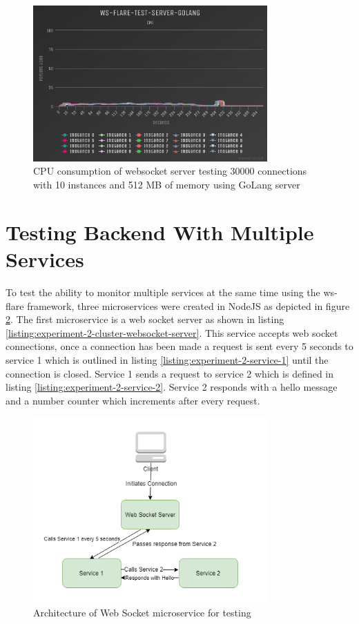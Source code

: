\begin{figure}[H]
  \centering
    \includegraphics[width=0.8\textwidth]{figures/experiments/experiment-1/golang/cpu-30000-512-10.png}
    \caption{CPU consumption of websocket server testing 30000 connections with 10 instances and 512 MB of memory using GoLang server}
    \label{fig:experiment-1-golang-cpu-30000-512-10}
\end{figure}

\section{Testing Backend With Multiple Services}

To test the ability to monitor multiple services at the same time using the ws-flare framework, three microservices were created in NodeJS as depicted in figure \ref{fig:experiment-2-architecture}. The first microservice is a web socket server as shown in listing \ref{listing:experiment-2-cluster-websocket-server}. This service accepts web socket connections, once a connection has been made a request is sent every 5 seconds to service 1 which is outlined in listing \ref{listing:experiment-2-service-1} until the connection is closed. Service 1 sends a request to service 2 which is defined in listing \ref{listing:experiment-2-service-2}. Service 2 responds with a hello message and a number counter which increments after every request.

\begin{figure}[H]
  \centering
    \includegraphics[width=0.8\textwidth]{figures/experiments/experiment-2-multiple-services.png}
    \caption{Architecture of Web Socket microservice for testing}
    \label{fig:experiment-2-architecture}
\end{figure}

